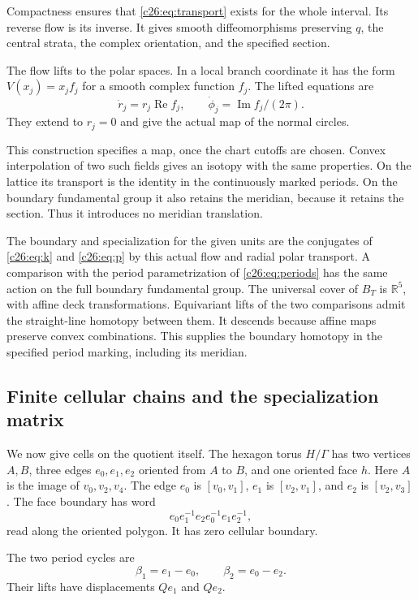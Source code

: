 Compactness ensures that \eqref{c26:eq:transport} exists for the whole interval.
Its reverse flow is its inverse. It gives smooth diffeomorphisms preserving
$q$, the central strata, the complex orientation, and the specified section.

The flow lifts to the polar spaces. In a local branch coordinate it
has the form $V(x_j)=x_j f_j$ for a smooth complex function $f_j$.
The lifted equations are
\[
\dot r_j=r_j\operatorname{Re}f_j,\qquad
\dot\phi_j=\operatorname{Im}f_j/(2\pi).
\]
They extend to $r_j=0$ and give the actual map of the normal circles.

This construction specifies a map, once the chart cutoffs are chosen.
Convex interpolation of two such fields gives an isotopy with the same
properties. On the lattice its transport is the identity in the
continuously marked periods. On the boundary fundamental group it also
retains the meridian, because it retains the section.
Thus it introduces no meridian translation.

The boundary and specialization for the given units are the conjugates
of \eqref{c26:eq:k} and \eqref{c26:eq:p} by this actual flow and radial
polar transport. A comparison with the period parametrization of
\eqref{c26:eq:periods} has the same action on the full boundary fundamental
group. The universal cover of $B_T$ is $\mathbb R^5$, with affine deck
transformations. Equivariant lifts of the two comparisons admit the
straight-line homotopy between them. It descends because affine maps
preserve convex combinations. This supplies the boundary homotopy in
the specified period marking, including its meridian.

\subsection{Finite cellular chains and the specialization matrix}\label{c26:sec:specialization}

We now give cells on the quotient itself.
The hexagon torus $H/\Gamma$ has two vertices $A,B$, three edges
$e_0,e_1,e_2$ oriented from $A$ to $B$, and one oriented face $h$.
Here $A$ is the image of $v_0,v_2,v_4$.
The edge $e_0$ is $[v_0,v_1]$, $e_1$ is $[v_2,v_1]$, and
$e_2$ is $[v_2,v_3]$.
The face boundary has word
\[
e_0e_1^{-1}e_2e_0^{-1}e_1e_2^{-1},
\]
read along the oriented polygon. It has zero cellular boundary.

The two period cycles are
\begin{equation}\label{c26:eq:beta-cells}
\beta_1=e_1-e_0,\qquad \beta_2=e_0-e_2.
\end{equation}
Their lifts have displacements $Qe_1$ and $Qe_2$.

